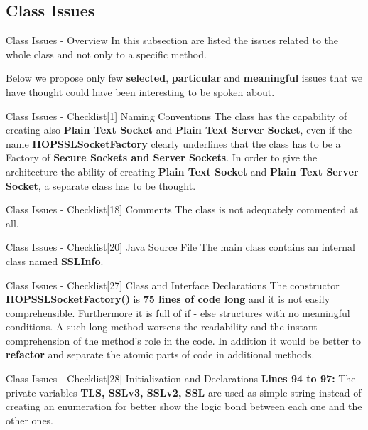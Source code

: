 \documentclass{../common/latex_classes/pdf_presentation}
\begin{document}
	\subsection{Class Issues}
	
	\begin{frame}{Class Issues - Overview}
		In this subsection are listed the issues related to the whole class and not only to a specific method. \par Below we propose only few \textbf{selected}, \textbf{particular} and \textbf{meaningful} issues that we have thought could have been interesting to be spoken about.
	\end{frame}
	\begin{frame}{Class Issues - Checklist[1] Naming Conventions}
		The class has the capability of creating also \textbf{Plain Text Socket} and \textbf{Plain Text Server Socket}, even if the name \textbf{IIOPSSLSocketFactory} clearly underlines that the class has to be a Factory of \textbf{Secure Sockets and Server Sockets}. In order to give the architecture the ability of creating \textbf{Plain Text Socket} and \textbf{Plain Text Server Socket}, a separate class has to be thought.
	\end{frame}
	\begin{frame}{Class Issues - Checklist[18] Comments}
		The class is not adequately commented at all.
	\end{frame}
	\begin{frame}{Class Issues - Checklist[20] Java Source File}
		The main class contains an internal class named \textbf{SSLInfo}.
	\end{frame}
	\begin{frame}{Class Issues - Checklist[27] Class and Interface Declarations}
		The constructor \textbf{IIOPSSLSocketFactory()} is \textbf{75 lines of code long} and it is not easily comprehensible. Furthermore it is full of if - else structures with no meaningful conditions. A such long method worsens the readability and the instant comprehension of the method’s role in the code. In addition it would be better to \textbf{refactor} and separate the atomic parts of code in additional methods.
	\end{frame}
	\begin{frame}{Class Issues - Checklist[28] Initialization and Declarations}
		\textbf{Lines 94 to 97:} The private variables \textbf{TLS, SSLv3, SSLv2, SSL} are used as simple string instead of creating an enumeration for better show the logic bond between each one and the other ones.
	\end{frame}
\end{document}

